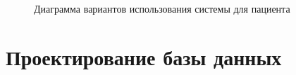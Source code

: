 
\begin{figure}[!t]
	\caption{Диаграмма вариантов использования системы для пациента}
\end{figure}


%
%
%
%
%

\section{Проектирование базы данных}

